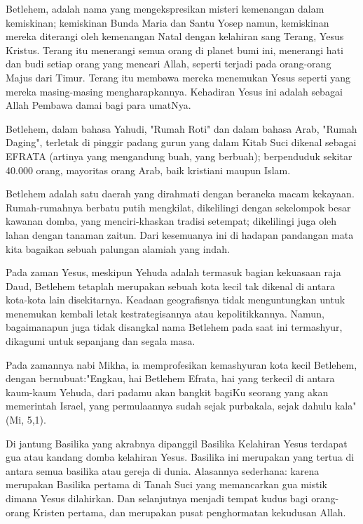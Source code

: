 Betlehem, adalah nama yang mengekspresikan misteri kemenangan dalam kemiskinan; kemiskinan Bunda Maria dan Santu Yosep namun, kemiskinan mereka diterangi oleh kemenangan Natal dengan kelahiran sang Terang, Yesus Kristus. Terang itu menerangi semua orang di planet bumi ini, menerangi hati dan budi setiap orang yang mencari Allah, seperti terjadi pada orang-orang Majus dari Timur. Terang itu membawa mereka menemukan Yesus seperti yang mereka masing-masing mengharapkannya. Kehadiran Yesus ini adalah sebagai Allah Pembawa damai bagi para umatNya.

Betlehem, dalam bahasa Yahudi, "Rumah Roti" dan dalam bahasa Arab, "Rumah Daging", terletak di pinggir padang gurun yang dalam Kitab Suci dikenal sebagai EFRATA (artinya yang mengandung buah, yang berbuah); berpenduduk sekitar 40.000 orang, mayoritas orang Arab, baik kristiani maupun Islam.

Betlehem adalah satu daerah yang dirahmati dengan beraneka macam kekayaan. Rumah-rumahnya berbatu putih mengkilat, dikelilingi dengan sekelompok besar kawanan domba, yang menciri-khaskan tradisi setempat; dikelilingi juga oleh lahan dengan tanaman zaitun. Dari kesemuanya ini di hadapan pandangan mata kita bagaikan sebuah palungan alamiah yang indah. 

Pada zaman Yesus, meskipun Yehuda adalah termasuk bagian kekuasaan raja Daud, Betlehem tetaplah merupakan sebuah kota kecil tak dikenal di antara kota-kota lain disekitarnya. Keadaan geografisnya tidak menguntungkan untuk menemukan kembali letak kestrategisannya atau kepolitikkannya. Namun, bagaimanapun juga tidak disangkal nama Betlehem pada saat ini termashyur, dikagumi untuk sepanjang dan segala masa. 

Pada zamannya nabi Mikha, ia memprofesikan kemashyuran kota kecil Betlehem, dengan bernubuat:"Engkau, hai Betlehem Efrata, hai yang terkecil di antara kaum-kaum Yehuda, dari padamu akan bangkit bagiKu seorang yang akan memerintah Israel, yang permulaannya sudah sejak purbakala, sejak dahulu kala" (Mi, 5,1).

Di jantung Basilika yang akrabnya dipanggil Basilika Kelahiran Yesus terdapat gua atau kandang domba kelahiran Yesus. Basilika ini merupakan yang tertua di antara semua basilika atau gereja di dunia. Alasannya sederhana: karena merupakan Basilika pertama di Tanah Suci yang memancarkan gua mistik dimana Yesus dilahirkan. Dan selanjutnya menjadi tempat kudus bagi orang-orang Kristen pertama, dan merupakan pusat penghormatan kekudusan Allah. 

